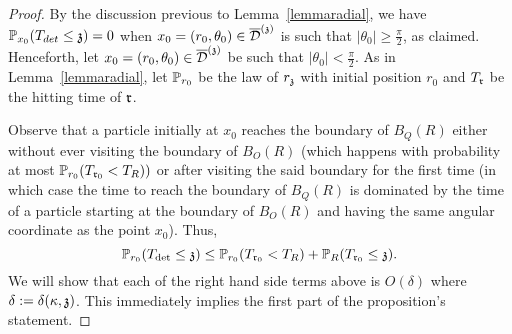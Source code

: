 \begin{proof}
By the discussion previous to Lemma~\ref{lemmaradial}, we have $\P_{x_0}(T_{det}\leq\ss)=0$
  when $x_0=(r_0,\theta_0)\in\ndt$ is such that $|\theta_0|\geq\frac{\pi}{2}$, as claimed.
Henceforth, let $x_0=(r_0,\theta_0)\in\ndt$ be such that
$|\theta_0|<\frac{\pi}{2}$.  
As in Lemma~\ref{lemmaradial}, 
let $\P_{r_0}$ be the law of $r_\ss$ with initial position $r_0$
and $T_{\rabs}$ be the hitting time of $\rabs$.

Observe that a particle initially at $x_0$ reaches the boundary of $B_{Q}(R)$ either without ever visiting the boundary of $B_O(R)$ (which happens with probability at most $\P_{r_0}(T_{\rabs_0}<T_R))$ or after visiting the 
said boundary for the first time (in which case the time to reach the boundary of $B_Q(R)$ is dominated by the time of a particle starting at the boundary of $B_O(R)$ and having 
the same angular coordinate as the point $x_0$).
Thus,
\[
\P_{r_0}(T_{\det}\leq\ss) \leq \P_{r_0}(T_{\rabs_0}<T_R)+\P_{R}(T_{\rabs_0}\leq\ss).
\]
We will show that each of the right hand side terms above is $O(\delta)$
where $\delta:=\delta(\kappa,\ss)$. This immediately implies
the first part of the proposition's statement.


\end{proof}
